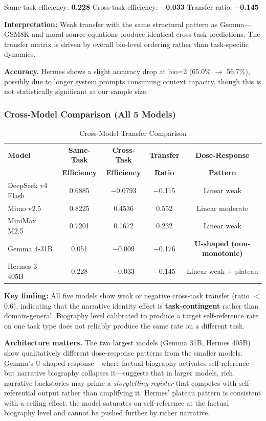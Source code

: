 \documentclass[11pt,a4paper]{article}
\begin{document}
Same-task efficiency: \textbf{0.228} \quad Cross-task efficiency: \textbf{$-$0.033} \quad Transfer ratio: \textbf{$-$0.145}

\textbf{Interpretation:} Weak transfer with the same structural pattern as Gemma---GSM8K and moral source equations produce identical cross-task predictions. The transfer matrix is driven by overall bio-level ordering rather than task-specific dynamics.

\textbf{Accuracy.} Hermes shows a slight accuracy drop at bio=2 (65.0\% $\rightarrow$ 56.7\%), possibly due to longer system prompts consuming context capacity, though this is not statistically significant at our sample size.

\subsubsection{Cross-Model Comparison (All 5 Models)}

\begin{table}[H]
\centering
\caption{Cross-Model Transfer Comparison}
\label{tab:ct_all}
\begin{tabular}{lcccc}
\toprule
\textbf{Model} & \textbf{Same-Task} & \textbf{Cross-Task} & \textbf{Transfer} & \textbf{Dose-Response} \\
 & \textbf{Efficiency} & \textbf{Efficiency} & \textbf{Ratio} & \textbf{Pattern} \\
\midrule
DeepSeek v4 Flash & 0.6885 & $-$0.0793 & $-$0.115 & Linear weak \\
Mimo v2.5 & 0.8225 & 0.4536 & 0.552 & Linear moderate \\
MiniMax M2.5 & 0.7201 & 0.1672 & 0.232 & Linear weak \\
Gemma 4-31B & 0.051 & $-$0.009 & $-$0.176 & \textbf{U-shaped (non-monotonic)} \\
Hermes 3-405B & 0.228 & $-$0.033 & $-$0.145 & Linear weak + plateau \\
\bottomrule
\end{tabular}
\end{table}

\textbf{Key finding:} All five models show weak or negative cross-task transfer (ratio $<$ 0.6), indicating that the narrative identity effect is \textbf{task-contingent} rather than domain-general. Biography level calibrated to produce a target self-reference rate on one task type does not reliably produce the same rate on a different task.

\textbf{Architecture matters.} The two largest models (Gemma 31B, Hermes 405B) show qualitatively different dose-response patterns from the smaller models. Gemma's U-shaped response---where factual biography activates self-reference but narrative biography collapses it---suggests that in larger models, rich narrative backstories may prime a \textit{storytelling register} that competes with self-referential output rather than amplifying it. Hermes' plateau pattern is consistent with a ceiling effect: the model saturates on self-reference at the factual biography level and cannot be pushed further by richer narrative.
\end{document}
